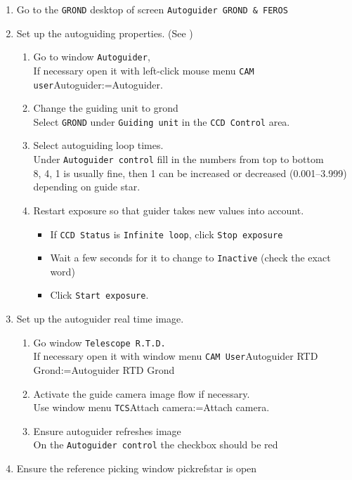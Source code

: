 \documentclass[11pt,fleqn,a4paper]{book}
\makeatletter
\def\menu#1#2{\texttt{#1}\ifx{}#2\else\@for\@x:=#2\do{$\rightarrow$\texttt{\@x}}\fi}
\def\wmenu#1#2{window menu \menu{#1}{#2}}
\def\mmenu#1#2{left-click mouse menu \menu{#1}{#2}}
\makeatother
\begin{document}
\begin{enumerate}
\begin{enumerate}
    \item Go to the \texttt{GROND} \gls{desktop} of screen \texttt{Autoguider GROND \& FEROS}
    \item Set up the autoguiding properties. (See )
    \begin{enumerate}
      \item Go to window \texttt{Autoguider},\\
            If necessary open it with \mmenu{CAM user}{Autoguider}.
      \item Change the guiding unit to \gls{grond}\\
            Select \texttt{GROND} under \texttt{Guiding unit} in the \texttt{CCD Control} area. 
      \item Select autoguiding loop times.\\
            Under \texttt{Autoguider control} fill in the numbers from top to bottom\\
            8, 4, 1 is usually fine, then 1 can be increased or decreased (0.001--3.999) depending on guide star.
      \item Restart exposure so that guider takes new values into account.
      \begin{itemize}
        \item If \texttt{CCD Status} is \texttt{Infinite loop}, click \texttt{Stop exposure}
        \item Wait a few seconds for it to change to \texttt{Inactive} (check the exact word)%
        \item Click \texttt{Start exposure}.
      \end{itemize}
    \end{enumerate}
    \item Set up the autoguider real time image.
    \begin{enumerate}
      \item Go window \texttt{Telescope R.T.D.}\\
              If necessary open it with \wmenu{CAM User}{Autoguider RTD Grond} 
      \item Activate the guide camera image flow if necessary.\\
              Use \wmenu{TCS}{Attach camera}.
      \item Ensure autoguider refreshes image\\
              On the \texttt{Autoguider control} the checkbox  should be red
    \end{enumerate}
    \item Ensure the reference picking window \gls{pickrefstar} is open\\

\end{enumerate}
\end{enumerate}
\end{document}
